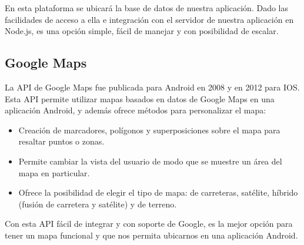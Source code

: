 En esta plataforma se ubicará la base de datos de nuestra aplicación. Dado las facilidades de acceso a ella e integración con el servidor de nuestra aplicación en Node.js, es una opción simple, fácil de manejar y con posibilidad de escalar.

\subsection{ Google Maps }

La API de Google Maps \cite{URL::GoogleMapsApi} fue publicada para Android en 2008 y en 2012 para IOS. Esta API permite utilizar mapas basados en datos de Google Maps en una aplicación Android, y además ofrece métodos para personalizar el mapa:
\begin{itemize}
    \item Creación de marcadores, polígonos y superposiciones sobre el mapa para resaltar puntos o zonas. 
    \item Permite cambiar la vista del usuario de modo que se muestre un área del mapa en particular. 
    \item Ofrece la posibilidad de elegir el tipo de mapa: de carreteras, satélite, híbrido (fusión de carretera y satélite) y de terreno.
\end{itemize}

Con esta API fácil de integrar y con soporte de Google, es la mejor opción para tener un mapa funcional y que nos permita ubicarnos en una aplicación Android.
